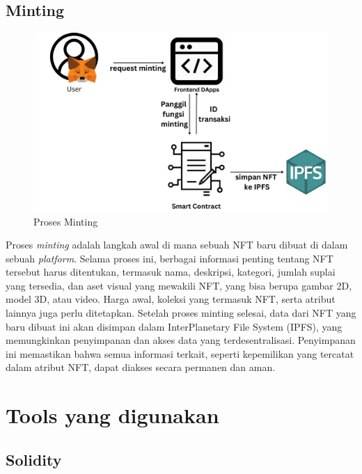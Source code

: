 \subsection{Minting}
\begin{figure} [H] \centering
  \includegraphics[scale=0.25]{gambar/proses_minting.png}
  \caption{Proses Minting}
  \label{fig:prosesminting}
\end{figure}


Proses \emph{minting} adalah langkah awal di mana sebuah NFT baru dibuat di dalam sebuah \emph{platform}. Selama proses ini, berbagai informasi penting tentang NFT tersebut harus ditentukan, termasuk nama, deskripsi, kategori, jumlah suplai yang tersedia, dan aset visual yang mewakili NFT, yang bisa berupa gambar 2D, model 3D, atau video. Harga awal, koleksi yang termasuk NFT, serta atribut lainnya juga perlu ditetapkan. Setelah proses minting selesai, data dari NFT yang baru dibuat ini akan disimpan dalam InterPlanetary File System (IPFS), yang memungkinkan penyimpanan dan akses data yang terdesentralisasi. Penyimpanan ini memastikan bahwa semua informasi terkait, seperti kepemilikan yang tercatat dalam atribut NFT, dapat diakses secara permanen dan aman.

\vspace{0.5 cm}

\section{Tools yang digunakan}
\label{sec:tools}
\subsection{Solidity}

